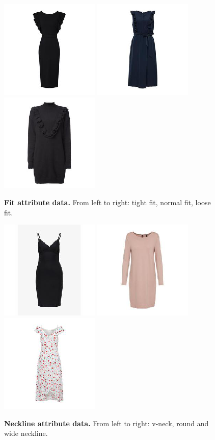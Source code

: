 \documentclass[12pt]{report}
\begin{document}
\begin{figure}[!h]
{\includegraphics[width=.23\linewidth]{03_analysis/data/fit_tight}}
{\includegraphics[width=.23\linewidth]{03_analysis/data/fit_normal}}
{\includegraphics[width=.23\linewidth]{03_analysis/data/fit_loose}}
\caption{\label{fig:fit_data} \textbf{Fit attribute data.} From left to right: tight fit, normal fit, loose fit.}

{\includegraphics[width=.23\linewidth]{03_analysis/data/neckline_v}}
{\includegraphics[width=.23\linewidth]{03_analysis/data/neckline_round}}
{\includegraphics[width=.23\linewidth]{03_analysis/data/neckline_wide}}
\caption{\label{fig:neckline_data} \textbf{Neckline attribute data.} From left to right: v-neck, round and wide neckline.}


\end{figure}
\end{document}
